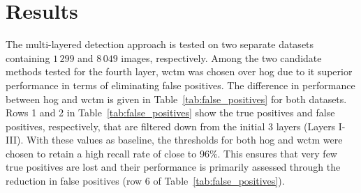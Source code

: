 \documentclass {udthesis}
\begin{document}
\section{Results}
%
The multi-layered detection approach is tested on two separate datasets containing  $1\,299$ and $8\,049$ images, respectively.
Among the two candidate methods tested for the fourth layer, \gls{wctm} was chosen over \gls{hog} due to it superior performance in terms of eliminating false positives. 
The difference in performance between \gls{hog} and \gls{wctm} is given in Table~\ref{tab:false_positives} for both datasets. 
Rows 1 and 2 in Table~\ref{tab:false_positives} show the true positives and false positives, respectively, that are filtered down from the initial 3 layers (Layers I-III). 
With these values as baseline, the thresholds for both \gls{hog} and \gls{wctm} were chosen to retain a high recall rate of close to 96\%. 
This ensures that very few true positives are lost and their performance is primarily assessed through the reduction in false positives (row 6 of Table~\ref{tab:false_positives}). 
\end{document}
